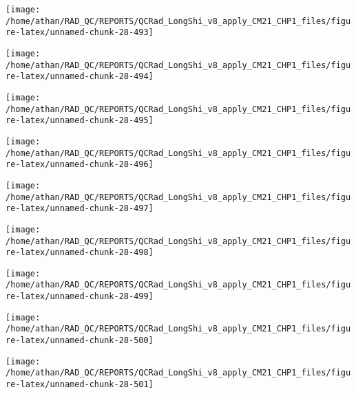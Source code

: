 \documentclass[
  10pt,
  a4paper,oneside]{article}
\begin{document}
\begin{center}\texttt{[image: /home/athan/RAD\_QC/REPORTS/QCRad\_LongShi\_v8\_apply\_CM21\_CHP1\_files/figure-latex/unnamed-chunk-28-493]} \end{center}

\begin{center}\texttt{[image: /home/athan/RAD\_QC/REPORTS/QCRad\_LongShi\_v8\_apply\_CM21\_CHP1\_files/figure-latex/unnamed-chunk-28-494]} \end{center}

\begin{center}\texttt{[image: /home/athan/RAD\_QC/REPORTS/QCRad\_LongShi\_v8\_apply\_CM21\_CHP1\_files/figure-latex/unnamed-chunk-28-495]} \end{center}

\begin{center}\texttt{[image: /home/athan/RAD\_QC/REPORTS/QCRad\_LongShi\_v8\_apply\_CM21\_CHP1\_files/figure-latex/unnamed-chunk-28-496]} \end{center}

\begin{center}\texttt{[image: /home/athan/RAD\_QC/REPORTS/QCRad\_LongShi\_v8\_apply\_CM21\_CHP1\_files/figure-latex/unnamed-chunk-28-497]} \end{center}

\begin{center}\texttt{[image: /home/athan/RAD\_QC/REPORTS/QCRad\_LongShi\_v8\_apply\_CM21\_CHP1\_files/figure-latex/unnamed-chunk-28-498]} \end{center}

\begin{center}\texttt{[image: /home/athan/RAD\_QC/REPORTS/QCRad\_LongShi\_v8\_apply\_CM21\_CHP1\_files/figure-latex/unnamed-chunk-28-499]} \end{center}

\begin{center}\texttt{[image: /home/athan/RAD\_QC/REPORTS/QCRad\_LongShi\_v8\_apply\_CM21\_CHP1\_files/figure-latex/unnamed-chunk-28-500]} \end{center}

\begin{center}\texttt{[image: /home/athan/RAD\_QC/REPORTS/QCRad\_LongShi\_v8\_apply\_CM21\_CHP1\_files/figure-latex/unnamed-chunk-28-501]} \end{center}
\end{document}
